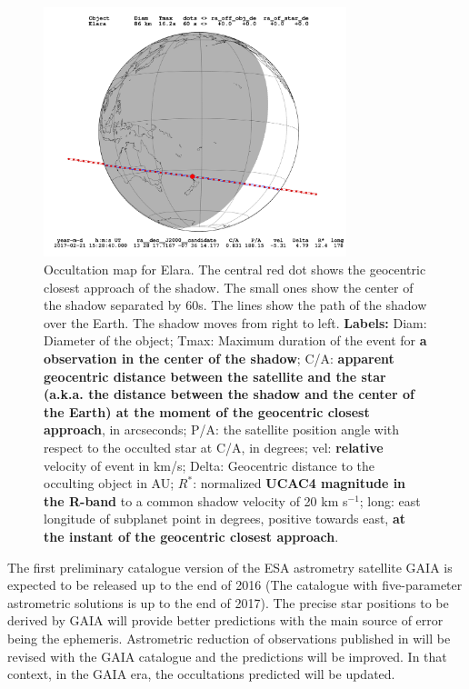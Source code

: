 \documentclass[useAMS,usenatbib]{mn2e}
\begin{document}
\begin{figure}
\begin{centering}
\includegraphics[width = 8.8cm]{figures/Elara_2017-02-21T15:28:40.png}   
\caption{Occultation map for Elara. %
The central red dot shows the geocentric closest approach of the shadow. The small ones show the center of the shadow separated by 60s. The lines show the path of the shadow over the Earth. The shadow moves from right to left.
\textbf{Labels:} Diam: Diameter of the object; Tmax: Maximum duration of the event for\textbf{ a observation in the center of the shadow}; C/A: \textbf{apparent geocentric distance between the satellite and the star (a.k.a. the distance between the shadow and the center of the Earth) at the moment of the geocentric closest approach}, in arcseconds; P/A: the satellite position angle with respect to the occulted star at C/A, in degrees; vel: \textbf{relative} velocity of event in km/s; Delta: Geocentric distance to the occulting object in AU; $R^*$: normalized \textbf{UCAC4 magnitude in the R-band} to a common shadow velocity of 20 km s$^{-1}$; long: east longitude of subplanet point in degrees, positive towards east, \textbf{at the instant of the geocentric closest approach}.}
\label{Fig: ocultacao}
\end{centering}
\end{figure}

The first preliminary catalogue version of the ESA astrometry satellite GAIA \citep{deBruijne2012} is expected to be released up to the end of 2016 (The catalogue with five-parameter astrometric solutions is up to the end of 2017). The precise star positions to be derived by GAIA will provide better predictions with the main source of error being the ephemeris. Astrometric reduction of observations published in  will be revised with the GAIA catalogue and the predictions will be improved. In that context, in the GAIA era, the occultations predicted will be updated.
\end{document}
